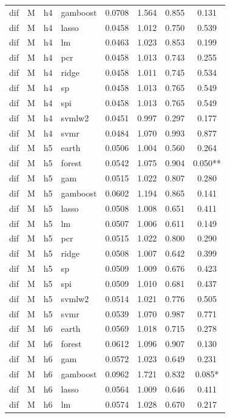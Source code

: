\begin{ThreePartTable}
\begin{longtable}[t]{llclcccc}
dif & M & h4 & gamboost & 0.0708 & 1.564 & 0.855 & 0.131\\
dif & M & h4 & lasso & 0.0458 & 1.012 & 0.750 & 0.539\\
dif & M & h4 & lm & 0.0463 & 1.023 & 0.853 & 0.199\\
dif & M & h4 & pcr & 0.0458 & 1.013 & 0.743 & 0.255\\
dif & M & h4 & ridge & 0.0458 & 1.011 & 0.745 & 0.534\\
dif & M & h4 & sp & 0.0458 & 1.013 & 0.765 & 0.549\\
dif & M & h4 & spi & 0.0458 & 1.013 & 0.765 & 0.549\\
dif & M & h4 & svmlw2 & 0.0451 & 0.997 & 0.297 & 0.177\\
dif & M & h4 & svmr & 0.0484 & 1.070 & 0.993 & 0.877\\
\addlinespace
dif & M & h5 & earth & 0.0506 & 1.004 & 0.560 & 0.264\\
dif & M & h5 & forest & 0.0542 & 1.075 & 0.904 & 0.050**\\
dif & M & h5 & gam & 0.0515 & 1.022 & 0.807 & 0.280\\
dif & M & h5 & gamboost & 0.0602 & 1.194 & 0.865 & 0.141\\
dif & M & h5 & lasso & 0.0508 & 1.008 & 0.651 & 0.411\\
dif & M & h5 & lm & 0.0507 & 1.006 & 0.611 & 0.149\\
dif & M & h5 & pcr & 0.0515 & 1.022 & 0.800 & 0.290\\
dif & M & h5 & ridge & 0.0508 & 1.007 & 0.642 & 0.399\\
dif & M & h5 & sp & 0.0509 & 1.009 & 0.676 & 0.423\\
dif & M & h5 & spi & 0.0509 & 1.010 & 0.681 & 0.437\\
dif & M & h5 & svmlw2 & 0.0514 & 1.021 & 0.776 & 0.505\\
dif & M & h5 & svmr & 0.0539 & 1.070 & 0.987 & 0.771\\
\addlinespace
dif & M & h6 & earth & 0.0569 & 1.018 & 0.715 & 0.278\\
dif & M & h6 & forest & 0.0612 & 1.096 & 0.907 & 0.130\\
dif & M & h6 & gam & 0.0572 & 1.023 & 0.649 & 0.231\\
dif & M & h6 & gamboost & 0.0962 & 1.721 & 0.832 & 0.085*\\
dif & M & h6 & lasso & 0.0564 & 1.009 & 0.646 & 0.411\\
dif & M & h6 & lm & 0.0574 & 1.028 & 0.670 & 0.217\\

\end{longtable}
\end{ThreePartTable}
